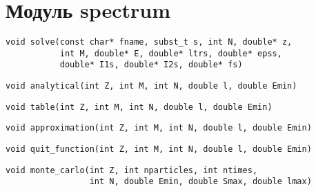 \section{Модуль spectrum}

\begin{verbatim}
void solve(const char* fname, subst_t s, int N, double* z,
           int M, double* E, double* ltrs, double* epss,
           double* I1s, double* I2s, double* fs)
\end{verbatim}

\begin{verbatim}
void analytical(int Z, int M, int N, double l, double Emin)
\end{verbatim}

\begin{verbatim}
void table(int Z, int M, int N, double l, double Emin)
\end{verbatim}

\begin{verbatim}
void approximation(int Z, int M, int N, double l, double Emin)
\end{verbatim}

\begin{verbatim}
void quit_function(int Z, int M, int N, double l, double Emin)
\end{verbatim}


\begin{verbatim}
void monte_carlo(int Z, int nparticles, int ntimes,
				 int N, double Emin, double Smax, double lmax)
\end{verbatim}